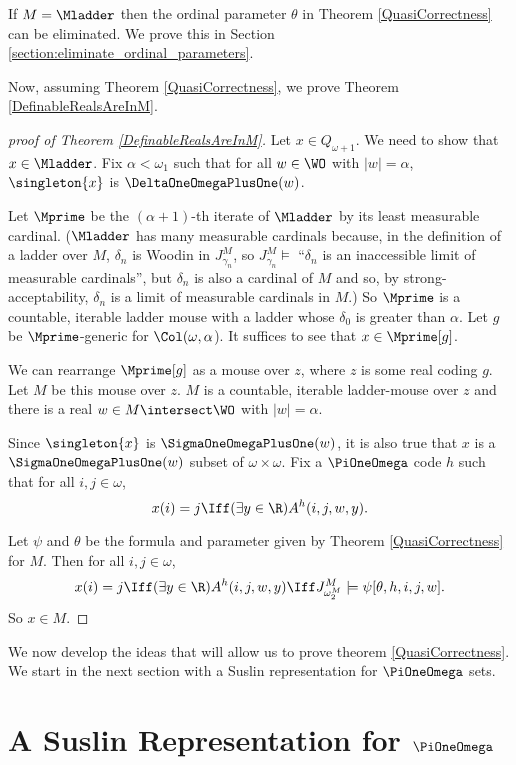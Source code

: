 \documentclass[oneside,12pt]{amsart}
\begin{document}
\begin{remark}
If $M=\Mladder$ then the ordinal parameter $\theta$ in Theorem \ref{QuasiCorrectness} can be eliminated.
We prove this in Section \ref{section:eliminate_ordinal_parameters}.
\end{remark}

Now, assuming Theorem \ref{QuasiCorrectness}, we prove Theorem \ref{DefinableRealsAreInM}.

\begin{proof}[proof of Theorem \ref{DefinableRealsAreInM}]
Let $x\in Q_{\omega+1}$. We need to show that $x\in\Mladder$.
Fix $\alpha<\omega_1$ such
that for all $w\in\WO$ with $|w|=\alpha$, $\singleton{x}$ is 
$\DeltaOneOmegaPlusOne(w)$.

Let $\Mprime$ be the $(\alpha+1)$-th iterate of $\Mladder$ by its least
measurable cardinal. ($\Mladder$ has many measurable cardinals because,
in the definition of a ladder over $M$, $\delta_n$ is Woodin in 
$J^M_{\gamma_n}$, so $J^M_{\gamma_n}\models$ ``$\delta_n$ is an inaccessible
limit of measurable cardinals'', but $\delta_n$ is also a cardinal of $M$
and so, by strong-acceptability, $\delta_n$ is a limit of measurable cardinals
in $M$.)
So $\Mprime$ is a countable, iterable ladder mouse with
a ladder whose $\delta_0$ is greater than $\alpha$. Let $g$ be $\Mprime$-generic
for $\Col(\omega,\alpha$). It suffices to see that $x\in\Mprime[g]$.

We can rearrange $\Mprime[g]$ as a mouse over $z$, where $z$ is some real coding $g$.
Let $M$ be this mouse over $z$. $M$ is a countable, iterable ladder-mouse over $z$ and there
is a real $w\in M\intersect\WO$ with $|w|=\alpha$.

Since $\singleton{x}$ is  $\SigmaOneOmegaPlusOne(w)$, it is also true that
$x$ is a $\SigmaOneOmegaPlusOne(w)$ subset of $\omega\times\omega$.
Fix a $\PiOneOmega$ code $h$ such that for all $i,j\in\omega$,
$$x(i)=j \Iff (\exists y\in\R)A^h(i,j,w,y).$$

Let $\psi$ and $\theta$ be the formula and parameter given by Theorem \ref{QuasiCorrectness}
for $M$. Then for all
$i,j\in\omega$,
$$x(i)=j \Iff (\exists y\in\R)A^h(i,j,w,y) \Iff J^M_{\omega_2^M} \models \psi[\theta,h,i,j,w].$$
So $x\in M$.
\end{proof}


We now develop the ideas that will allow us to prove theorem \ref{QuasiCorrectness}. We
start in the next section with a Suslin representation for $\PiOneOmega$ sets.

\section{A Suslin Representation for $\PiOneOmega$}
\label{section:suslinrep}
\end{document}
